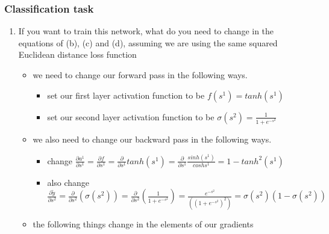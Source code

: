 \documentclass{article}
\begin{document}
\begin{enumerate}[(a)]
\subsubsection{Classification task}
\begin{enumerate}
    \item If you want to train this network, what do you need to change in the equations of (b), (c) and (d), assuming we are using the same squared Euclidean distance loss function
   \begin{itemize}
    \color{blue}
    \item  we need to change our forward pass in the following ways.
    \begin{itemize}
        \item set our first layer activation function to be $f(s^{1})=tanh(s^{1})$
        \item set our second layer activation function to be $\sigma(s^2)=\frac{1}{1+e^{-s^{2}}}$
    \end{itemize}
    \item we also need to change our backward pass in the following ways.
    \begin{itemize}
        \item change $\frac{\partial a^ {1}}{\partial s^{1}}=\frac{\partial f}{\partial s^{1}}=\frac{\partial }{\partial s^{1}}tanh(s^1)=\frac{\partial }{\partial s^{1}}\frac{sinh(s^{1})}{cosh{s^1}}=1-tanh^{2}(s^{1})$
        \item also change $\frac{\partial  \tilde{y}}{\partial s^{2}}=\frac{\partial }{\partial s^{2}}(\sigma(s^{2}))=\frac{\partial }{\partial s^{2}}(\frac{1}{1+e^{-s^{2}}})=\frac{e^{-s^{2}}}{((1+e^{-s^{2}})^2)}=\sigma(s^{2})(1-\sigma(s^{2}))$
    \end{itemize}
    \item the following things change in the elements of our gradients
\end{itemize}
\end{enumerate}
\end{enumerate}
\end{document}

